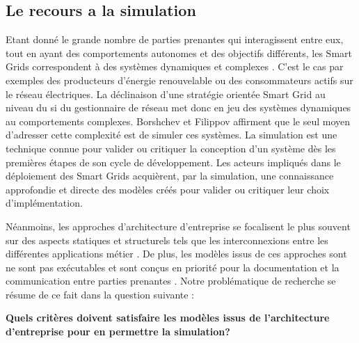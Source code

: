 
\subsection{Le recours a la simulation}

Etant donné le grande nombre de parties prenantes qui 
interagissent entre eux, tout en ayant des comportements autonomes et des 
objectifs différents, les Smart Grids correspondent à des systèmes  dynamiques et complexes 
\cite{monti_power_2010}. C'est le cas par exemples des producteurs d'énergie 
renouvelable ou des consommateurs actifs sur le réseau électriques. La 
déclinaison d'une stratégie orientée Smart Grid au niveau du 
\gls{si} du gestionnaire de réseau met donc en jeu des systèmes dynamiques au 
comportements complexes. Borshchev et Filippov\cite{borshchev2004system} 
affirment que le seul moyen d'adresser cette complexité est de simuler ces 
systèmes. La simulation est une technique connue pour valider ou critiquer la 
conception d'un système dès les premières étapes de son cycle de développement. 
Les acteurs impliqués dans le déploiement des 
Smart Grids acquièrent, par la  simulation, une connaissance approfondie et 
directe des modèles créés pour valider ou critiquer leur choix d'implémentation.

Néanmoins, les approches d'architecture d'entreprise se focalisent le plus 
souvent sur 
des aspects statiques et structurels tels que les interconnexions entre les 
différentes applications métier \cite{buckl2008towards}. De plus, les modèles 
issus de ces approches sont ne sont pas exécutables et sont conçus en priorité 
pour la documentation et la communication entre parties prenantes 
\cite{kulkarni2013modelling}. Notre 
problématique de recherche se résume de ce fait dans la question suivante :

\textbf{Quels critères doivent satisfaire les modèles issus de l'architecture 
d'entreprise pour en permettre la simulation?}
